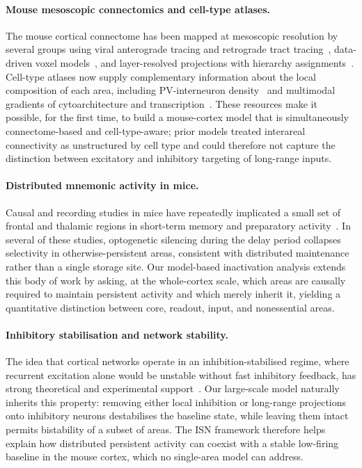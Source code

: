 \documentclass[11pt]{article}
\begin{document}
\paragraph{Mouse mesoscopic connectomics and cell-type atlases.}
The mouse cortical connectome has been mapped at mesoscopic resolution by several groups using viral anterograde tracing and retrograde tract tracing~\cite{oh2014mesoscale,gamanut2018mouse}, data-driven voxel models~\cite{knox2018highresolution}, and layer-resolved projections with hierarchy assignments~\cite{harris2019hierarchical}. Cell-type atlases now supply complementary information about the local composition of each area, including PV-interneuron density~\cite{kim2017braintype} and multimodal gradients of cytoarchitecture and transcription~\cite{fulcher2019overlapping}. These resources make it possible, for the first time, to build a mouse-cortex model that is simultaneously connectome-based and cell-type-aware; prior models treated interareal connectivity as unstructured by cell type and could therefore not capture the distinction between excitatory and inhibitory targeting of long-range inputs.

\paragraph{Distributed mnemonic activity in mice.}
Causal and recording studies in mice have repeatedly implicated a small set of frontal and thalamic regions in short-term memory and preparatory activity~\cite{guo2017maintenance,inagaki2019discrete,bolkan2017thalamic,schmitt2017thalamic,gilad2018behavioral}. In several of these studies, optogenetic silencing during the delay period collapses selectivity in otherwise-persistent areas, consistent with distributed maintenance rather than a single storage site. Our model-based inactivation analysis extends this body of work by asking, at the whole-cortex scale, which areas are causally required to maintain persistent activity and which merely inherit it, yielding a quantitative distinction between core, readout, input, and nonessential areas.

\paragraph{Inhibitory stabilisation and network stability.}
The idea that cortical networks operate in an inhibition-stabilised regime, where recurrent excitation alone would be unstable without fast inhibitory feedback, has strong theoretical and experimental support~\cite{tsodyks1997paradoxical,sanzeni2020inhibition}. Our large-scale model naturally inherits this property: removing either local inhibition or long-range projections onto inhibitory neurons destabilises the baseline state, while leaving them intact permits bistability of a subset of areas. The ISN framework therefore helps explain how distributed persistent activity can coexist with a stable low-firing baseline in the mouse cortex, which no single-area model can address.
\end{document}

